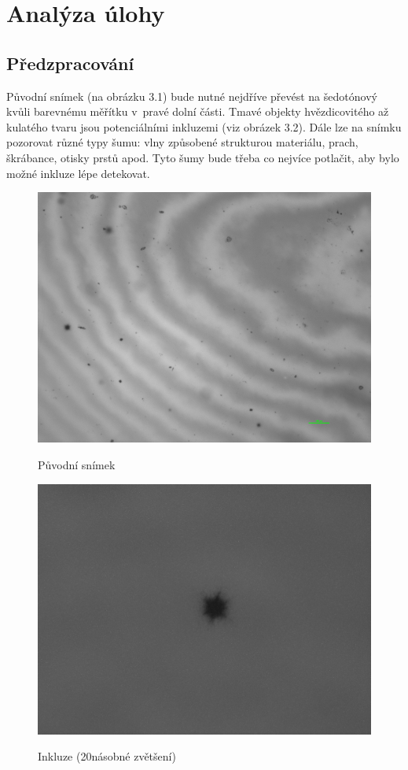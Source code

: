\documentclass[12pt, a4paper]{report}
\begin{document}
\chapter{Analýza úlohy}
	\section{Předzpracování}
	Původní snímek (na obrázku 3.1) bude nutné nejdříve převést na šedotónový kvůli barevnému měřítku v~pravé dolní části. Tmavé objekty hvězdicovitého až kulatého tvaru jsou potenciálními inkluzemi (viz obrázek 3.2). Dále lze na snímku pozorovat různé typy šumu: vlny způsobené strukturou materiálu, prach, škrábance, otisky prstů apod. Tyto šumy bude třeba co nejvíce potlačit, aby bylo možné inkluze lépe detekovat.
		
	\begin{figure}[!htb]
	\centering
	\includegraphics[scale=0.4]{obrazky/puvodni.png}
	\label{fig:puvodni}
	\caption{Původní snímek}
	\end{figure}
	
	\begin{figure}[!htb]
	\centering
	\includegraphics[scale=0.12]{obrazky/konvoluce.png}
	\label{fig:inkluze}
	\caption{Inkluze (20násobné zvětšení)}
	\end{figure}	
\end{document}
